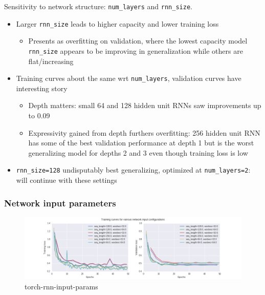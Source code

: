 Sensitivity to network structure: \texttt{num\_layers} and \texttt{rnn\_size}.
\begin{itemize}
    \item Larger \texttt{rnn\_size} leads to higher capacity and lower training loss
        \begin{itemize}
            \item Presents as overfitting on validation, where the lowest capacity
                model \texttt{rnn\_size} appears to be improving in generalization while
                others are flat/increasing
        \end{itemize}
    \item Training curves about the same wrt \texttt{num\_layers}, validation curves have interesting story
        \begin{itemize}
            \item Depth matters: small 64 and 128 hidden unit RNNs saw improvements up to 0.09
            \item Expressivity gained from depth furthers overfitting: 256
                hidden unit RNN has some of the best validation performance at
                depth 1 but is the worst generalizing model for depths 2
                and 3 even though training loss is low
        \end{itemize}
    \item \texttt{rnn\_size=128} undisputably best generalizing, optimized at
        \texttt{num\_layers=2}: will continue with these settings
\end{itemize}

\subsubsection{Network input parameters}


\begin{figure}[htpb]
    \centering
    \includegraphics[width=\linewidth]{torch-rnn-input-params.png}
    \caption{torch-rnn-input-params}
    \label{fig:torch-rnn-input-params}
\end{figure}

